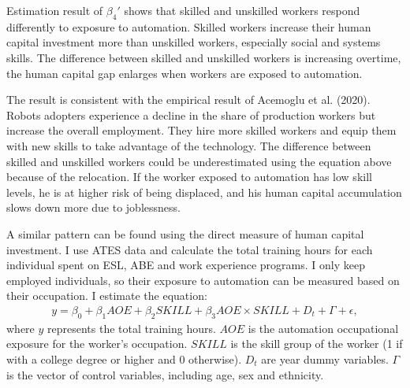 \documentclass[12pt]{article}
\begin{document}
Estimation result of $\beta_4'$ shows that skilled and unskilled workers respond differently to exposure to automation. Skilled workers increase their human capital investment more than unskilled workers, especially social and systems skills. The difference between skilled and unskilled workers is increasing overtime, the human capital gap enlarges when workers are exposed to automation. 

The result is consistent with the empirical result of Acemoglu et al. (2020)\nocite{Acemogluetal2020}. Robots adopters experience a decline in the share of production workers but increase the overall employment. They hire more skilled workers and equip them with new skills to take advantage of the technology.  The difference between skilled and unskilled workers could be underestimated using the equation above because of the relocation. If the worker exposed to automation has low skill levels, he is at higher risk of being displaced, and his human capital accumulation slows down more due to joblessness. 

A similar pattern can be found using the direct measure of human capital investment. I use ATES data and calculate the total training hours for each individual spent on ESL, ABE and work experience programs. I only keep employed individuals, so their exposure to automation can be measured based on their occupation. I estimate the equation: 
\begin{align}
y = \beta_0 + \beta_1 AOE + \beta_2 SKILL +\beta_3 AOE \times SKILL + D_t + \Gamma + \epsilon,
\end{align}
where $y$ represents the total training hours. $AOE$ is the automation occupational exposure for the worker's occupation. $SKILL$ is the skill group of the worker (1 if with a college degree or higher and 0 otherwise). $D_t$ are year dummy variables. $\Gamma$ is the vector of control variables, including age, sex and ethnicity. 
\end{document}

